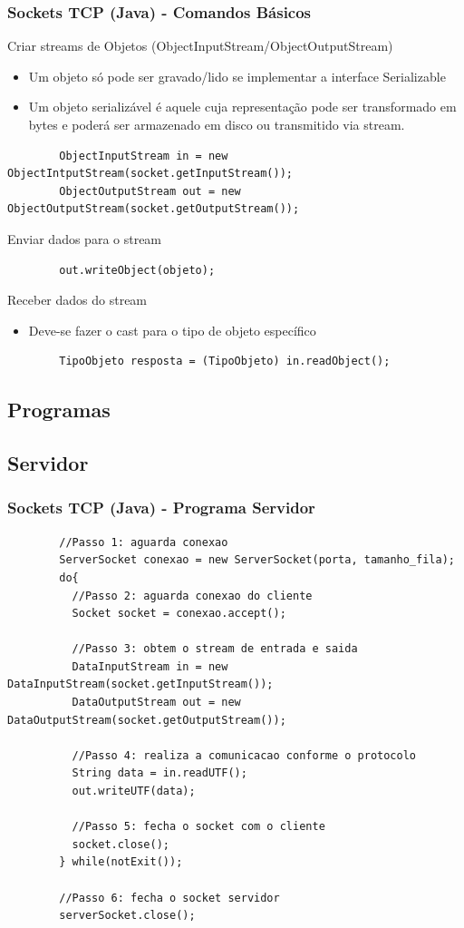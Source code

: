 \documentclass[hyperref={pdfpagelabels=false},table]{beamer}
\begin{document}
\begin{frame}[fragile]
	\frametitle{Sockets TCP (Java) - Comandos Básicos}

	Criar streams de Objetos (ObjectInputStream/ObjectOutputStream)
	\begin{itemize}
		\item Um objeto só pode ser gravado/lido se implementar a interface Serializable
		\item Um objeto serializável é aquele cuja representação pode ser transformado em bytes e poderá ser armazenado em disco ou transmitido via stream. 
	\end{itemize}

	\begin{lstlisting}
		ObjectInputStream in = new ObjectIntputStream(socket.getInputStream());
		ObjectOutputStream out = new ObjectOutputStream(socket.getOutputStream());
	\end{lstlisting} 

	Enviar dados para o stream
	\begin{lstlisting}
		out.writeObject(objeto);
	\end{lstlisting} 

	Receber dados do stream
	\begin{itemize}
		\item Deve-se fazer o cast para o tipo de objeto específico
	\end{itemize} 
	\begin{lstlisting}
		TipoObjeto resposta = (TipoObjeto) in.readObject();
	\end{lstlisting} 
\end{frame}

\subsection{Programas}

\subsection{Servidor}
\begin{frame}[fragile]
	\frametitle{Sockets TCP (Java) - Programa Servidor}

	\begin{lstlisting}
		//Passo 1: aguarda conexao
		ServerSocket conexao = new ServerSocket(porta, tamanho_fila);
		do{
		  //Passo 2: aguarda conexao do cliente
		  Socket socket = conexao.accept();

		  //Passo 3: obtem o stream de entrada e saida
		  DataInputStream in = new DataInputStream(socket.getInputStream());
		  DataOutputStream out = new DataOutputStream(socket.getOutputStream());
		
		  //Passo 4: realiza a comunicacao conforme o protocolo
		  String data = in.readUTF();
		  out.writeUTF(data);

		  //Passo 5: fecha o socket com o cliente
		  socket.close();
		} while(notExit());

		//Passo 6: fecha o socket servidor
		serverSocket.close();
	\end{lstlisting} 
\end{frame}
\end{document}
